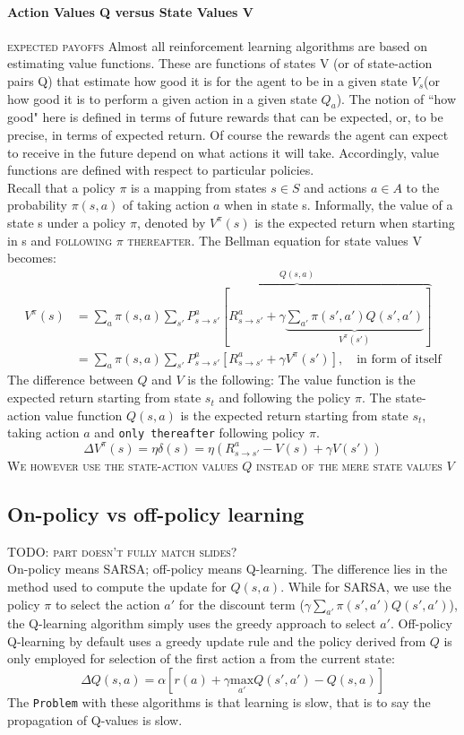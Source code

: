 \documentclass[11pt]{article}
\begin{document}
\paragraph{Action Values Q versus State Values V}
\textsc{expected payoffs}
Almost all reinforcement learning algorithms are based on estimating value functions. These are functions of states V (or of state-action pairs Q) that estimate how good it is for the agent to be in a given state $V_s$(or
how good it is to perform a given action in a given state $Q_a$). The notion of ``how good" here is defined in terms of future rewards that can be expected, or, to be precise, in terms of expected return. Of course the rewards the agent can expect to receive in the future depend on what actions it will take. Accordingly, value functions are defined with respect to particular policies.\\

Recall that a policy $\pi$ is a mapping from states $s \in S$ and actions $a \in A$ to the probability $\pi(s,a)$ of taking action $a$ when in state s. Informally, the value of a state s under a
policy $\pi$, denoted by $V^\pi(s)$ is the expected return when starting in s and \textsc{following $\pi$ thereafter}. %
The Bellman equation for state values V becomes:
\begin{align*}
	V^{\pi}(s)&=\sum_a \pi(s,a) \overbrace{\sum_{s'} P^a_{s \rightarrow s'} [R^a_{s \rightarrow s'} + \gamma \underbrace{\sum_{a'}\pi(s',a')Q(s',a')}_{V^\pi(s')}]}^{Q(s,a)}\\
	&=\sum_a \pi(s,a) \sum_{s'} P_{s \rightarrow s'}^a[R_{s \rightarrow s'}^a + \gamma V^{\pi}(s')],\quad\text{in form of itself}
\end{align*}
The difference between $Q$ and $V$ is the following: The value function is the expected return starting from state $s_t$ and following the policy $\pi$. The state-action value function $Q(s,a)$ is the expected return starting from state $s_t$, taking action $a$ and \texttt{only thereafter} following policy $\pi$.
\[
	\Delta V^\pi(s)=\eta \delta(s)=\eta(R_{s \rightarrow s'}^a - V(s)+\gamma V(s'))
\]
\textsc{We however use the state-action values $Q$ instead of the mere state values $V$}

\subsection{On-policy vs off-policy learning}
\textsc{TODO: part doesn't fully match slides?}\\
On-policy means SARSA; off-policy means Q-learning. The difference lies in the method used to compute the update for $Q(s,a)$. While for SARSA, we use the policy $\pi$ to select the action $a'$ for the discount term ($\gamma \sum_{a'} \pi(s',a')Q(s',a')$), the Q-learning algorithm simply uses the greedy approach to select $a'$. Off-policy Q-learning by default uses a greedy update rule and the policy derived from $Q$ is only employed for selection of the first action a from the current state:
\[
\Delta Q(s,a)=\alpha\left[r(a)+\gamma\underset{a'}{\text{max}} Q(s',a')-Q(s,a)\right]
\]
The \texttt{Problem} with these algorithms is that learning is slow, that is to say the propagation of Q-values is slow.
\end{document}
